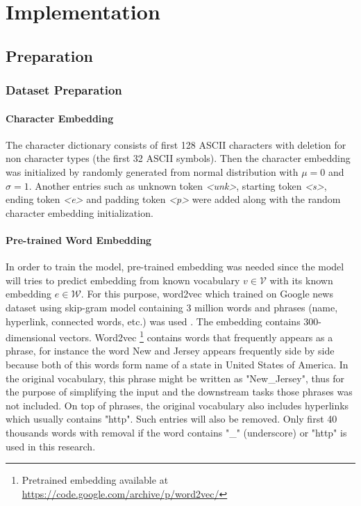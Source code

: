 \chapter{Implementation}
\label{chap:implementation}

\section{Preparation}
    \subsection{Dataset Preparation}
        \subsubsection{Character Embedding}
            The character dictionary consists of first 128 ASCII
            characters with deletion for non character types (the
            first 32 ASCII symbols). Then the character embedding was
            initialized by randomly generated from normal distribution
            with $\mu = 0$ and $\sigma = 1$. Another entries such as
            unknown token \textit{\textless unk\textgreater}, starting
            token \textit{\textless s\textgreater}, ending token
            \textit{\textless e\textgreater} and padding token
            \textit{\textless p\textgreater} were added along with the
            random character embedding initialization.

        \subsubsection{Pre-trained Word Embedding}
            In order to train the model, pre-trained embedding was
            needed since the model will tries to predict embedding
            from known vocabulary $v \in \mathcal{V}$ with its known
            embedding $e \in \mathcal{W}$. For this purpose, word2vec
            which trained on Google news dataset using skip-gram model
            containing 3 million words and phrases (name, hyperlink,
            connected words, etc.) was used
            \citep{Distributed2013mikolov}. The embedding contains
            300-dimensional vectors. Word2vec \footnote{Pretrained
            embedding available at 
            \url{https://code.google.com/archive/p/word2vec/}}
            contains words that frequently appears as a phrase, for
            instance the word New and Jersey appears frequently side
            by side because both of this words form name of a state in
            United States of America. In the original vocabulary, this
            phrase might be written as "New\_Jersey", thus for the
            purpose of simplifying the input and the downstream tasks
            those phrases was not included. On top of phrases, the
            original vocabulary also includes hyperlinks which usually
            contains "http". Such entries will also be removed. Only
            first 40 thousands words with removal if the word contains
            "\_" (underscore) or "http" is used in this research.
            
